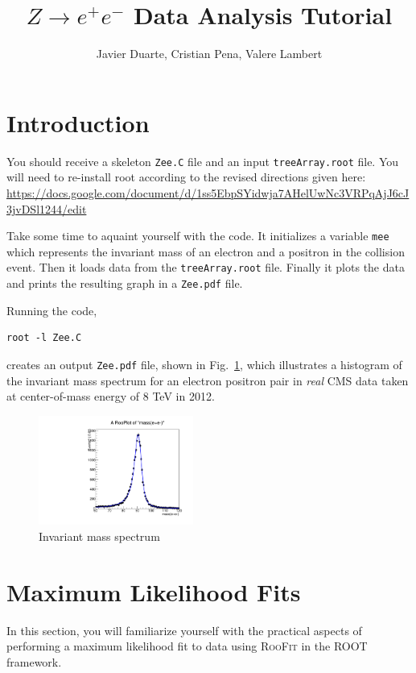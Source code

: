 \documentclass{article}
\begin{document}
\title{$Z\to e^+e^-$ Data Analysis Tutorial}
\author{Javier Duarte, Cristian Pena, Valere Lambert}
\maketitle

\tableofcontents

\section{Introduction}
You should receive a skeleton \texttt{Zee.C} file and an input \texttt{treeArray.root} file. You will need to re-install root according to the revised directions given here:\\
\url{https://docs.google.com/document/d/1ss5EbpSYidwja7AHelUwNc3VRPqAjJ6cJ3jvDSl1244/edit}

Take some time to aquaint yourself with the code. It initializes a variable \texttt{mee} which represents the invariant mass of an electron and a positron in the collision event. Then it loads data from the \texttt{treeArray.root} file. Finally it plots the data and prints the resulting graph in a \texttt{Zee.pdf} file.

Running the code,
\begin{verbatim}
root -l Zee.C
\end{verbatim}
creates an output \texttt{Zee.pdf} file, shown in Fig.~\ref{fig:Zee}, which illustrates a histogram of the invariant mass spectrum for an electron positron pair in \emph{real} CMS data taken at center-of-mass energy of 8 TeV in 2012.
\begin{figure}
    \centering
    \includegraphics[width=2.0in]{Zee.pdf}
    \caption{Invariant mass spectrum}
    \label{fig:Zee}
\end{figure} 

\section{Maximum Likelihood Fits}
In this section, you will familiarize yourself with the practical
aspects of performing a maximum likelihood fit to data using
\textsc{RooFit} in the \textsc{ROOT} framework.
\end{document}
